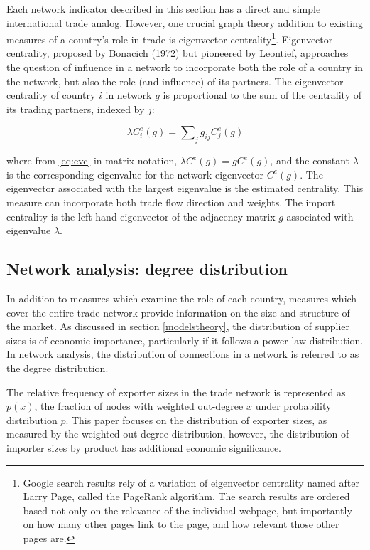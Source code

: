 \documentclass[10pt,letterpaper]{article}
\begin{document}
Each network indicator described in this section has a direct and simple international trade analog. However, one crucial graph theory addition to existing measures of a country's role in trade is eigenvector centrality\footnote{Google search results rely of a variation of eigenvector centrality named after Larry Page, called the PageRank algorithm. The search results are ordered based not only on the relevance of the individual webpage, but importantly on how many other pages link to the page, and how relevant those other pages are.}. Eigenvector centrality, proposed by Bonacich (1972) but pioneered by Leontief, approaches the question of influence in a network to incorporate both the role of a country in the network, but also the role (and influence) of its partners. The eigenvector centrality of country $i$ in network $g$ is proportional to the sum of the centrality of its trading partners, indexed by $j$:

\begin{equation}\label{eq:evc}
\lambda C^e_i(g) = \sum\nolimits_{j} g_{ij}C^e_j(g)
\end{equation}

where from \eqref{eq:evc} in matrix notation, $\lambda C^e(g) = gC^e(g)$, and the constant $\lambda$ is the corresponding eigenvalue for the network eigenvector $C^e(g)$. The eigenvector associated with the largest eigenvalue is the estimated centrality. This measure can incorporate both trade flow direction and weights. The import centrality is the left-hand eigenvector of the adjacency matrix $g$ associated with eigenvalue $\lambda$.

\subsection{Network analysis: degree distribution} \label{nw4}
In addition to measures which examine the role of each country, measures which cover the entire trade network provide information on the size and structure of the market. As discussed in section \ref{modelstheory}, the distribution of supplier sizes is of economic importance, particularly if it follows a power law distribution. In network analysis, the distribution of connections in a network is referred to as the degree distribution. 

The relative frequency of exporter sizes in the trade network is represented as $p(x)$, the fraction of nodes with weighted out-degree $x$ under probability distribution $p$. This paper focuses on the distribution of exporter sizes, as measured by the weighted out-degree distribution, however, the distribution of importer sizes by product has additional economic significance.
\end{document}
